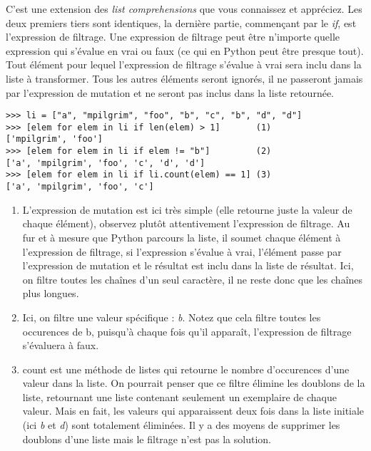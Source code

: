 C’est une extension des \emph{list comprehensions} que vous connaissez et appréciez. Les deux premiers tiers sont identiques, la dernière partie, commençant par le \emph{if}, est l’expression de filtrage. Une expression de filtrage peut être n’importe quelle expression qui s’évalue en vrai ou faux (ce qui en Python peut être presque tout). Tout élément pour lequel l’expression de filtrage s’évalue à vrai sera inclu dans la liste à transformer. Tous les autres éléments seront ignorés, il ne passeront jamais par l’expression de mutation et ne seront pas inclus dans la liste retournée.

\begin{example}
\begin{lstlisting}
>>> li = ["a", "mpilgrim", "foo", "b", "c", "b", "d", "d"]
>>> [elem for elem in li if len(elem) > 1]       (1)
['mpilgrim', 'foo']
>>> [elem for elem in li if elem != "b"]         (2)
['a', 'mpilgrim', 'foo', 'c', 'd', 'd']
>>> [elem for elem in li if li.count(elem) == 1] (3)
['a', 'mpilgrim', 'foo', 'c']
\end{lstlisting}
\end{example}

\begin{enumerate}
    \item{L’expression de mutation est ici très simple (elle retourne juste la valeur de chaque élément), observez plutôt attentivement l’expression de filtrage. Au fur et à mesure que Python parcours la liste, il soumet chaque élément à l’expression de filtrage, si l’expression s’évalue à vrai, l’élément passe par l’expression de mutation et le résultat est inclu dans la liste de résultat. Ici, on filtre toutes les chaînes d’un seul caractère, il ne reste donc que les chaînes plus longues.}
    \item{Ici, on filtre une valeur spécifique : \emph{b}. Notez que cela filtre toutes les occurences de b, puisqu’à chaque fois qu’il apparaît, l’expression de filtrage s’évaluera à faux.}
    \item{count est une méthode de listes qui retourne le nombre d’occurences d’une valeur dans la liste. On pourrait penser que ce filtre élimine les doublons de la liste, retournant une liste contenant seulement un exemplaire de chaque valeur. Mais en fait, les valeurs qui apparaissent deux fois dans la liste initiale (ici \emph{b} et \emph{d}) sont totalement éliminées. Il y a des moyens de supprimer les doublons d’une liste mais le filtrage n’est pas la solution.}
\end{enumerate}

